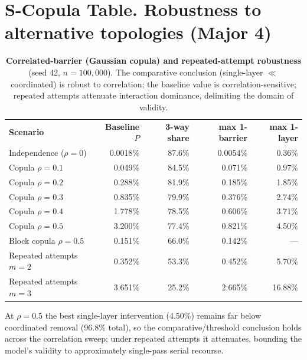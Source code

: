 \documentclass[10pt,letterpaper]{article}
\newlength\savedwidth
\newcommand\thickhline{\noalign{\global\savedwidth\arrayrulewidth\global\arrayrulewidth 2pt}\hline\noalign{\global\arrayrulewidth\savedwidth}}
\begin{document}
\section*{S-Copula Table. Robustness to alternative topologies (Major 4)}
\begin{table}[!ht]\centering
\caption{{\bf Correlated-barrier (Gaussian copula) and repeated-attempt robustness} (seed 42, $n=100{,}000$). The comparative conclusion (single-layer $\ll$ coordinated) is robust to correlation; the baseline value is correlation-sensitive; repeated attempts attenuate interaction dominance, delimiting the domain of validity.}
\label{SCopula}
\begin{tabular}{l r r r r}
\hline \textbf{Scenario} & \textbf{Baseline $P$} & \textbf{3-way share} & \textbf{max 1-barrier} & \textbf{max 1-layer} \\ \thickhline
Independence ($\rho=0$) & 0.0018\% & 87.6\% & 0.0054\% & 0.36\% \\
Copula $\rho=0.1$ & 0.049\% & 84.5\% & 0.071\% & 0.97\% \\
Copula $\rho=0.2$ & 0.288\% & 81.9\% & 0.185\% & 1.85\% \\
Copula $\rho=0.3$ & 0.835\% & 79.9\% & 0.376\% & 2.74\% \\
Copula $\rho=0.4$ & 1.778\% & 78.5\% & 0.606\% & 3.71\% \\
Copula $\rho=0.5$ & 3.200\% & 77.4\% & 0.821\% & 4.50\% \\ \hline
Block copula $\rho=0.5$ & 0.151\% & 66.0\% & 0.142\% & --- \\ \hline
Repeated attempts $m=2$ & 0.352\% & 53.3\% & 0.452\% & 5.70\% \\
Repeated attempts $m=3$ & 3.651\% & 25.2\% & 2.665\% & 16.88\% \\ \hline
\end{tabular}
\end{table}

At $\rho=0.5$ the best single-layer intervention (4.50\%) remains far below coordinated removal (96.8\% total), so the comparative/threshold conclusion holds across the correlation sweep; under repeated attempts it attenuates, bounding the model's validity to approximately single-pass serial recourse.
\end{document}
